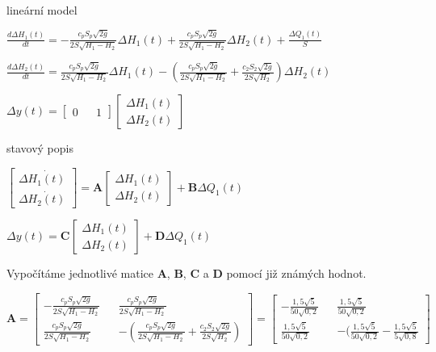 \documentclass{article}
\begin{document}
			\begin{center}
			lineární model

			\bigskip

			$\frac{d\Delta H_1(t)}{dt}=-\frac{c_pS_p\sqrt{2g}}{2S\sqrt{H_1-H_2}}\Delta H_1(t)+\frac{c_pS_p\sqrt{2g}}{2S\sqrt{H_1-H_2}}\Delta H_2(t)+\frac{\Delta Q_1(t)}{S}$

			\bigskip

			$\frac{d\Delta H_2(t)}{dt}=\frac{c_pS_p\sqrt{2g}}{2S\sqrt{H_1-H_2}}\Delta H_1(t)-(\frac{c_pS_p\sqrt{2g}}{2S\sqrt{H_1-H_2}}+\frac{c_2S_2\sqrt{2g}}{2S\sqrt{H_2}})\Delta H_2(t)$

			\bigskip

			$\Delta y(t)=\begin{bmatrix}
			0 && 1
			\end{bmatrix}
			\begin{bmatrix}
				\Delta H_1(t)\\
				\Delta H_2(t)
			\end{bmatrix}$

			\bigskip

			stavový popis

			\bigskip

			$\begin{bmatrix}
			\Delta \dot{H_1(t)}\\
			\Delta \dot{H_2(t)}
			\end{bmatrix}=\textbf{A}\begin{bmatrix}
			\Delta H_1(t)\\
			\Delta H_2(t)
			\end{bmatrix}+\textbf{B}\Delta Q_1(t)$

			\bigskip

			$\Delta y(t)=\textbf{C}\begin{bmatrix}
			\Delta H_1(t)\\
			\Delta H_2(t)
			\end{bmatrix}+\textbf{D}\Delta Q_1(t)$

\bigskip

			Vypočítáme jednotlivé matice \textbf{A}, \textbf{B}, \textbf{C} a \textbf{D} pomocí již známých hodnot.

\bigskip

			$\textbf{A}=\begin{bmatrix}
			-\frac{c_pS_p\sqrt{2g}}{2S\sqrt{H_1-H_2}} && \frac{c_pS_p\sqrt{2g}}{2S\sqrt{H_1-H_2}} \\
			\frac{c_pS_p\sqrt{2g}}{2S\sqrt{H_1-H_2}} && -(\frac{c_pS_p\sqrt{2g}}{2S\sqrt{H_1-H_2}}+\frac{c_2S_2\sqrt{2g}}{2S\sqrt{H_2}})
			\end{bmatrix}=\begin{bmatrix}
			-\frac{1,5\sqrt{5}}{50\sqrt{0,2}} && \frac{1,5\sqrt{5}}{50\sqrt{0,2}}\\
			\frac{1,5\sqrt{5}}{50\sqrt{0,2}}&& -(\frac{1,5\sqrt{5}}{50\sqrt{0,2}}-\frac{1,5\sqrt{5}}{5\sqrt{0,8}}
			\end{bmatrix}$


\end{center}
\end{document}
